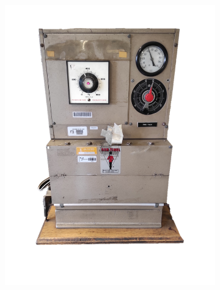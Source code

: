 \begin{refsection}
\begin{figure}[h]
\begin{subfigure}[b]{0.3\linewidth}
        \includegraphics[width=\linewidth]{Documento_Latex/Tesis 2/Imagenes/Sealer.png}
        \label{fig:sealer}
    \end{subfigure}
    \begin{subfigure}[b]{0.3\linewidth}
        \centering

\end{subfigure}
\end{figure}
\end{refsection}
